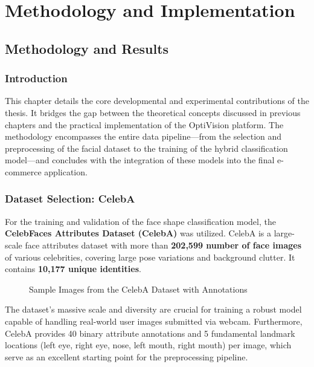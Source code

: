 \part{Methodology and Implementation}
\label{chap:methodology_part}

\chapter{Methodology and Results}
\label{chap:methodology}

\section{Introduction}
\label{sec:meth_intro}

This chapter details the core developmental and experimental contributions of the thesis. It bridges the gap between the theoretical concepts discussed in previous chapters and the practical implementation of the OptiVision platform. The methodology encompasses the entire data pipeline—from the selection and preprocessing of the facial dataset to the training of the hybrid classification model—and concludes with the integration of these models into the final e-commerce application.

\section{Dataset Selection: CelebA}
\label{sec:meth_dataset}

For the training and validation of the face shape classification model, the \textbf{CelebFaces Attributes Dataset (CelebA)} was utilized. CelebA is a large-scale face attributes dataset with more than \textbf{202,599 number of face images} of various celebrities, covering large pose variations and background clutter. It contains \textbf{10,177 unique identities}.

\begin{figure}[H]
    \centering
    \vspace{8cm}
    \caption{Sample Images from the CelebA Dataset with Annotations}
    \label{fig:celeba_samples}
\end{figure}

The dataset's massive scale and diversity are crucial for training a robust model capable of handling real-world user images submitted via webcam. Furthermore, CelebA provides 40 binary attribute annotations and 5 fundamental landmark locations (left eye, right eye, nose, left mouth, right mouth) per image, which serve as an excellent starting point for the preprocessing pipeline.

